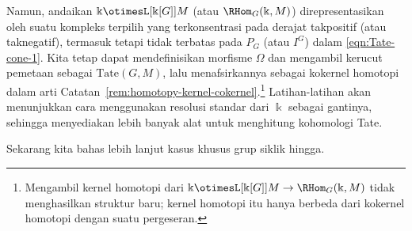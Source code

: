 Namun, andaikan
$\Bbbk \otimesL[{\Bbbk[G]}] M$ (atau $\RHom_G(\Bbbk,M)$) direpresentasikan
oleh suatu kompleks terpilih yang terkonsentrasi pada derajat takpositif (atau
taknegatif), termasuk tetapi tidak terbatas pada $P_G$ (atau $I^G$) dalam
\eqref{eqn:Tate-cone-1}. Kita tetap dapat mendefinisikan morfisme $\Omega$ dan
mengambil kerucut pemetaan sebagai $\mathrm{Tate}(G,M)$, lalu menafsirkannya
sebagai kokernel homotopi dalam arti
Catatan~\ref{rem:homotopy-kernel-cokernel}.\footnote{Mengambil kernel homotopi
dari $\Bbbk \otimesL[{\Bbbk[G]}] M \to \RHom_G(\Bbbk, M)$ tidak menghasilkan
struktur baru; kernel homotopi itu hanya berbeda dari kokernel homotopi dengan
suatu pergeseran.} Latihan-latihan akan menunjukkan cara menggunakan resolusi
standar dari $\Bbbk$ sebagai gantinya, sehingga menyediakan lebih banyak alat
untuk menghitung kohomologi Tate.

Sekarang kita bahas lebih lanjut kasus khusus grup siklik hingga.

